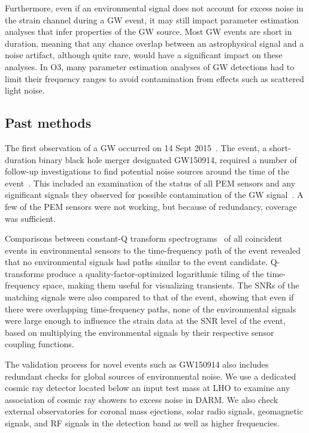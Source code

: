 Furthermore, even if an environmental signal does not account for excess noise in the strain channel during a GW event, it may still impact parameter estimation analyses that infer properties of the GW source.
Most GW events are short in duration, meaning that any chance overlap between an astrophysical signal and a noise artifact, although quite rare, would have a significant impact on these analyses.
In O3, many parameter estimation analyses of GW detections had to limit their frequency ranges to avoid contamination from effects such as scattered light noise.


\subsection{Past methods}

The first observation of a \ac{GW} occurred on 14 Sept 2015~\citep{gw150914}.
The event, a short-duration binary black hole merger designated GW150914, required a number of follow-up investigations to find potential noise sources around the time of the event~\citep{Detchar_2016}.
This included an examination of the status of all \ac{PEM} sensors and any significant signals they observed for possible contamination of the GW signal~\citep{Schofield_150914}.
A few of the \ac{PEM} sensors were not working, but because of redundancy, coverage was sufficient.

Comparisons between constant-Q transform spectrograms~\citep{Chatterji_2004} of all coincident events in environmental sensors to the time-frequency path of the event revealed that no environmental signals had paths similar to the event candidate.
Q-transforms produce a quality-factor-optimized logarithmic tiling of the time-frequency space, making them useful for visualizing transients.
The \acp{SNR} of the matching signals were also compared to that of the event, showing that even if there were overlapping time-frequency paths, none of the environmental signals were large enough to influence the strain data at the \ac{SNR} level of the event, based on multiplying the environmental signals by their respective sensor coupling functions.

The validation process for novel events such as GW150914 also includes redundant checks for global sources of environmental noise.
We use a dedicated cosmic ray detector located below an input test mass at \ac{LHO} to examine any association of cosmic ray showers to excess noise in \ac{DARM}.
We also check external observatories for coronal mass ejections, solar radio signals, geomagnetic signals, and \ac{RF} signals in the detection band as well as higher frequencies.

